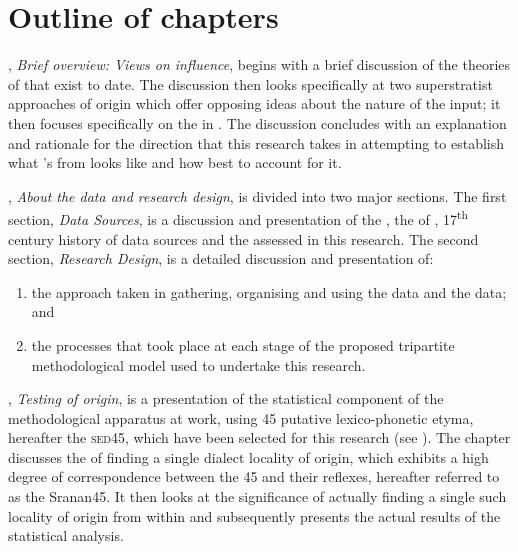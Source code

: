 \section{Outline of chapters}\label{1.5}
, \emph{Brief overview: Views on  influence}, begins with a brief discussion of the theories of  that exist to date. The discussion then looks specifically at two superstratist approaches of origin which offer opposing ideas about the nature of the  input; it then focuses specifically on the  in . The discussion concludes with an explanation and rationale for the direction that this research takes in attempting to establish what 's  from  looks like and how best to account for it.

, \emph{About the data and research design}, is divided into two major sections. The first section, \emph{Data Sources}, is a discussion and presentation of the , the  of , 17\textsuperscript{th} century history of  data sources and the  assessed in this research. The second section, \emph{Research Design}, is a detailed discussion and presentation of:

\begin{enumerate}
\renewcommand{\labelenumi}{\alph{enumi}.} 
\item the approach taken in gathering, organising and using the   data and the  data; and
\item the processes that took place at each stage of the proposed tripartite methodological model used to undertake this research.
\end{enumerate}

, \emph{Testing  of origin}, is a presentation of the statistical component of the methodological apparatus at work, using 45 putative lexico-pho\-net\-ic  etyma, hereafter the \textsc{sed45}, which have been selected for this research (see ). The chapter discusses the  of finding a single dialect locality of origin, which exhibits a high degree of correspondence between the 45  and their  reflexes, hereafter referred to as the Sranan45. It then looks at the significance of actually finding a single such locality of origin from within  and subsequently presents the actual results of the statistical analysis.

